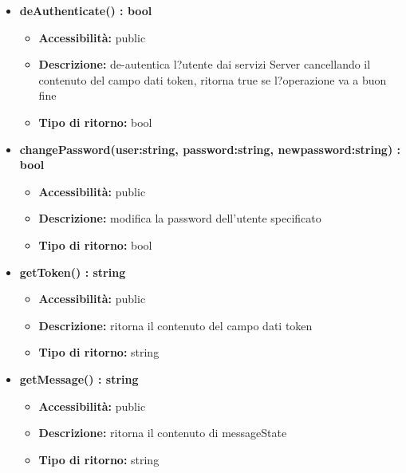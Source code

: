 {\begin{itemize}
		\item \textbf{deAuthenticate() : bool}
			\begin{itemize}
			\item \textbf{Accessibilit\`{a}:} public
			\item \textbf{Descrizione:} de-autentica l?utente dai servizi Server cancellando il contenuto del campo dati token, ritorna true se l?operazione va a buon fine
			\item \textbf{Tipo di ritorno:} bool
			\end{itemize}
			
		\item \textbf{changePassword(user:string, password:string, newpassword:string) : bool}
			\begin{itemize}
			\item \textbf{Accessibilit\`{a}:} public
			\item \textbf{Descrizione:} modifica la password dell'utente specificato
			\item \textbf{Tipo di ritorno:} bool
			\end{itemize}
			
		\item \textbf{getToken() : string}
			\begin{itemize}
			\item \textbf{Accessibilit\`{a}:} public
			\item \textbf{Descrizione:} ritorna il contenuto del campo dati token
			\item \textbf{Tipo di ritorno:} string
			\end{itemize}
			
		\item \textbf{getMessage() : string}
			\begin{itemize}
			\item \textbf{Accessibilit\`{a}:} public
			\item \textbf{Descrizione:} ritorna il contenuto di messageState
			\item \textbf{Tipo di ritorno:} string
			\end{itemize}

		\end{itemize}
	}
	
	
	
	
	
	
	
	
	
	